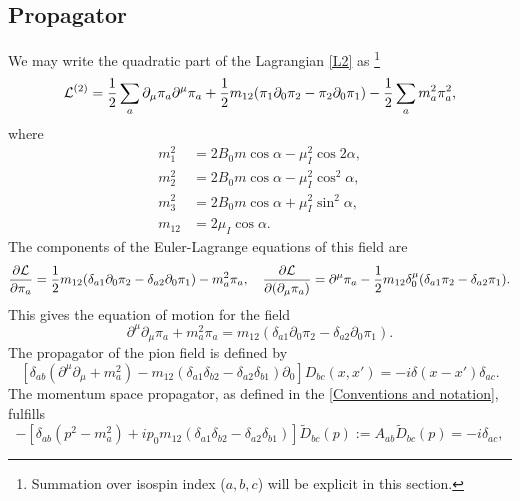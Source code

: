 \subsection{Propagator}

We may write the quadratic part of the Lagrangian \autoref{L2} as \footnote{Summation over isospin index ($a,b,c$) will be explicit in this section.}
\begin{align}
    \mathcal{L}^{(2)}
    =
    \frac{1}{2} \sum_a \partial_\mu \pi_a \partial^\mu \pi_a
    + \frac{1}{2} m_{12} (\pi_1 \partial_0 \pi_2 - \pi_2 \partial_0 \pi_1)
    - \frac{1}{2} \sum_a m_a^2 \pi_a^2,
\end{align}
where
\begin{align}
    m_1^2 &= 2 B_0 m \cos{\alpha} - \mu_I^2 \cos{2\alpha}, \\
    m_2^2 &= 2 B_0 m \cos{\alpha} - \mu_I^2 \cos^2{\alpha}, \\
    m_3^2 &= 2 B_0 m \cos{\alpha} + \mu_I^2 \sin^2{\alpha}, \\
    m_{12} &= 2 \mu_I \cos{\alpha}.
\end{align}
The components of the Euler-Lagrange equations of this field are
\begin{equation*}
    \pdv{\mathcal{L}}{\pi_a} = 
    \frac{1}{2} m_{12} (\delta_{a1} \partial_0 \pi_2 - \delta_{a2}\partial_0 \pi_1) 
    - m^2_{a} \pi_a, \quad
    \pdv{\mathcal{L}}{(\partial_\mu \pi_a)} = 
    \partial^\mu \pi_a - \frac{1}{2} m_{12} \delta^\mu_0 (\delta_{a1}\pi_2  - \delta_{a2}\pi_1).
\end{equation*}
This gives the equation of motion for the field
\begin{equation}
    \partial^\mu \partial_\mu \pi_a + m_a^2 \pi_a
    =  m_{12}(\delta_{a1} \partial_0 \pi_2  - \delta_{a2} \partial_0 \pi_1).
\end{equation}
The propagator of the pion field is defined by
\begin{equation}
    \left[
        \delta_{ab}(\partial^\mu\partial_\mu + m^2_a)
        -  m_{12}(\delta_{a1} \delta_{b2} - \delta_{a2}\delta_{b1}) \partial_0
    \right] 
    D_{bc}(x, x') 
    = -i \delta(x - x') \delta_{ac}.
\end{equation}
The momentum space propagator, as defined in the \autoref{Conventions and notation}, fulfills
\begin{equation*}
    -\left[
        \delta_{ab}(p^2 - m_a^2)
        +  i p_0 m_{12}(\delta_{a1} \delta_{b2} - \delta_{a2}\delta_{b1}) 
    \right] 
    \tilde D_{bc}(p) 
    := A_{ab} \tilde D_{bc}(p) = -i \delta_{ac},
\end{equation*}
